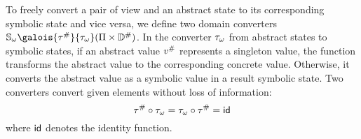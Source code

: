 To freely convert a pair of view and an abstract state to its corresponding
symbolic state and vice versa, we define two domain converters $\symbstset
\galois{\saconverter}{\asconverter} (\viewset \times \absdom)$.  In the
converter ${\tau}_\omega$ from abstract states to symbolic states, if an abstract
value ${v}^{\#}$ represents a singleton value, the function transforms the
abstract value to the corresponding concrete value.  Otherwise, it converts the
abstract value as a symbolic value in a result symbolic state.  Two converters
convert given elements without loss of information:
\[
  {\tau}^{\#} \circ {\tau}_\omega = {\tau}_\omega \circ {\tau}^{\#} = \textsf{id}
\]
where $\textsf{id}$ denotes the identity function.
